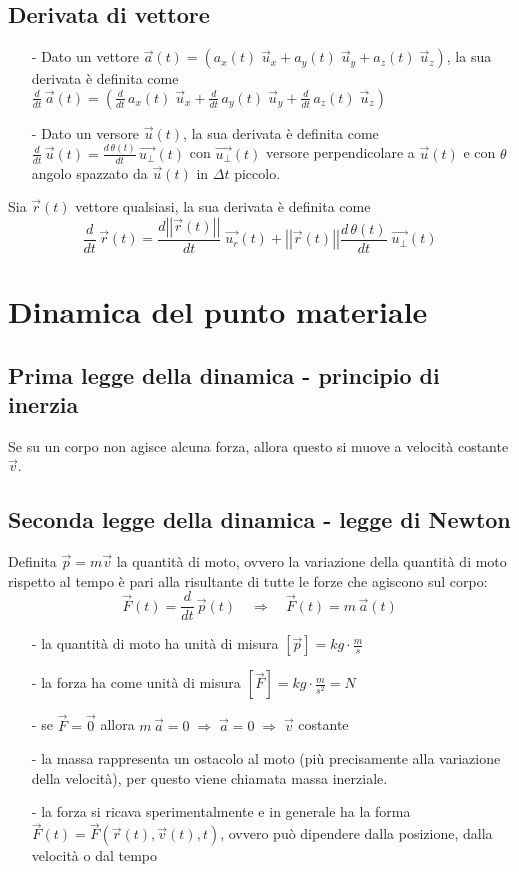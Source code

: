 \documentclass[a4paper]{article}
\newcommand\ux{\vec{u}_x}
\newcommand\uy{\vec{u}_y}
\newcommand\uz{\vec{u}_z}
\newcommand\dt{\frac{d}{dt}\,}
\newcommand\vmod[1]{\left|\left|{#1}\right|\right|}
\begin{document}
\subsection{Derivata di vettore}
\begin{itemize}
	\item[-] Dato un vettore \(\vec{a}(t) = (a_x(t) \; \ux + a_y(t) \; \uy + a_z(t) \; \uz)\), la sua derivata è definita come \\
	\(\displaystyle \dt \vec{a}(t) = \left(\dt a_x(t) \; \ux + \dt a_y(t) \; \uy + \dt a_z(t) \; \uz\right)\)
	\item[-] Dato un versore \(\vec{u}(t)\), la sua derivata è definita come \(\displaystyle \dt \vec{u}(t) = \frac{d \, \theta(t)}{dt} \, \vec{u_\perp}(t)\)
	con \(\vec{u_\perp}(t)\) versore perpendicolare a \(\vec{u}(t)\) e con \(\theta\) angolo spazzato da \(\vec{u}(t)\) in \(\Delta t\) piccolo.
\end{itemize}
Sia \(\vec{r}(t)\) vettore qualsiasi, la sua derivata è definita come
\[\dt \vec{r}(t) = \frac{d \vmod{\vec{r}(t)}}{dt} \; \vec{u_r}(t) + \vmod{\vec{r}(t)} \frac{d \, \theta(t)}{dt} \; \vec{u_\perp}(t)\]

\newpage


\section{Dinamica del punto materiale}
\subsection{Prima legge della dinamica - principio di inerzia}
Se su un corpo non agisce alcuna forza, allora questo si muove a velocità costante \(\vec{v}\).

\subsection{Seconda legge della dinamica - legge di Newton}
Definita \(\vec{p} = m \vec{v}\) la quantità di moto, ovvero la variazione della quantità di moto rispetto al tempo è pari alla
risultante di tutte le forze che agiscono sul corpo:
\[\vec{F}(t) = \dt \vec{p}(t) \quad \Rightarrow \quad \vec{F}(t) = m \, \vec{a}(t)\]

\begin{itemize}[topsep=3pt, itemsep=0pt]
	\item[-] la quantità di moto ha unità di misura \(\displaystyle \left[\vec{p}\right] = kg \cdot \frac{m}{s}\)
	\item[-] la forza ha come unità di misura \(\displaystyle \left[\vec{F}\right] = kg \cdot \frac{m}{s^2} = N\)
	\item[-] se \(\vec{F} = \vec{0}\) allora \(m \, \vec{a} = 0 \; \Rightarrow \; \vec{a} = 0 \; \Rightarrow \; \vec{v}\) costante
	\item[-] la massa rappresenta un ostacolo al moto (più precisamente alla variazione della velocità), per questo viene chiamata massa inerziale.
	\item[-] la forza si ricava sperimentalmente e in generale ha la forma \(\vec{F}(t) = \vec{F}(\vec{r}(t), \vec{v}(t), t)\), ovvero può dipendere
	dalla posizione, dalla velocità o dal tempo
\end{itemize}
\end{document}
